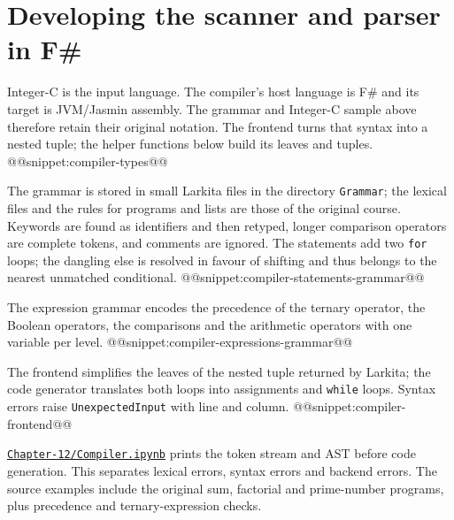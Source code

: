 \section{Developing the scanner and parser in F\#}
Integer-C is the input language.
The compiler's host language is F\# and its target is JVM/Jasmin assembly.
The grammar and Integer-C sample above therefore retain their original notation.
The frontend turns that syntax into a nested tuple; the helper functions below build its leaves and tuples.
@@snippet:compiler-types@@

The grammar is stored in small Larkita files in the directory \texttt{Grammar}; the lexical files and the rules for programs and lists are those of the original course.
Keywords are found as identifiers and then retyped, longer comparison operators are complete tokens, and comments are ignored.
The statements add two \texttt{for} loops; the dangling else is resolved in favour of shifting and thus belongs to the nearest unmatched conditional.
@@snippet:compiler-statements-grammar@@

The expression grammar encodes the precedence of the ternary operator, the Boolean operators, the comparisons and the arithmetic operators with one variable per level.
@@snippet:compiler-expressions-grammar@@

The frontend simplifies the leaves of the nested tuple returned by Larkita; the code generator translates both loops into assignments and \texttt{while} loops.
Syntax errors raise \texttt{UnexpectedInput} with line and column.
@@snippet:compiler-frontend@@

\href{../../Chapter-12/Compiler.ipynb}{\nolinkurl{Chapter-12/Compiler.ipynb}} prints the token stream and AST before code generation.
This separates lexical errors, syntax errors and backend errors.
The source examples include the original sum, factorial and prime-number programs, plus precedence and ternary-expression checks.
